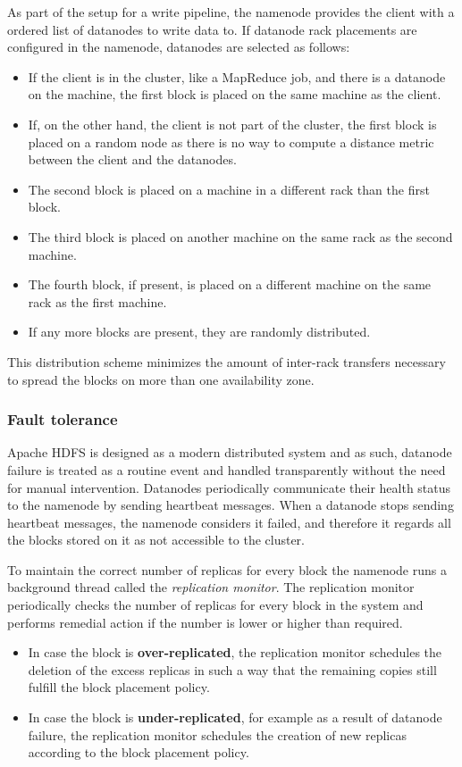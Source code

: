 As part of the setup for a write pipeline, the namenode provides the client with a ordered list of datanodes to write data to.
If datanode rack placements are configured in the namenode, datanodes are selected as follows:
\begin{itemize}
\item If the client is in the cluster, like a MapReduce job, and there is a datanode on the machine, the first block is placed on the same machine as the client.
\item If, on the other hand, the client is not part of the cluster, the first block is placed on a random node as there is no way to compute a distance metric between the client and the datanodes.
\item The second block is placed on a machine in a different rack than the first block.
\item The third block is placed on another machine on the same rack as the second machine.
\item The fourth block, if present, is placed on a different machine on the same rack as the first machine.
\item If any more blocks are present, they are randomly distributed.
\end{itemize}
This distribution scheme minimizes the amount of inter-rack transfers necessary to spread the blocks on more than one availability zone.

\subsubsection{Fault tolerance}
Apache HDFS is designed as a modern distributed system and as such, datanode failure is treated as a routine event and handled transparently without the need for manual intervention.
Datanodes periodically communicate their health status to the namenode by sending heartbeat messages.
When a datanode stops sending heartbeat messages, the namenode considers it failed, and therefore it regards all the blocks stored on it as not accessible to the cluster.

To maintain the correct number of replicas for every block the namenode runs a background thread called the \textit{replication monitor}.
The replication monitor periodically checks the number of replicas for every block in the system and performs remedial action if the number is lower or higher than required.
\begin{itemize}
\item In case the block is \textbf{over-replicated}, the replication monitor schedules the deletion of the excess replicas in such a way that the remaining copies still fulfill the block placement policy.
\item In case the block is \textbf{under-replicated}, for example as a result of datanode failure, the replication monitor schedules the creation of new replicas according to the block placement policy.
\end{itemize}


